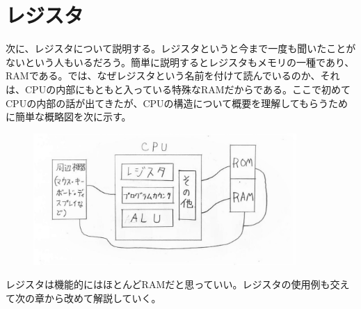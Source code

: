 \section{レジスタ}
次に、レジスタについて説明する。レジスタというと今まで一度も聞いたことがないという人もいるだろう。簡単に説明するとレジスタもメモリの一種であり、RAMである。では、なぜレジスタという名前を付けて読んでいるのか、それは、CPUの内部にもともと入っている特殊なRAMだからである。ここで初めてCPUの内部の話が出てきたが、CPUの構造について概要を理解してもらうために簡単な概略図を次に示す。\\
\begin{figure}[H]
  \centering
  \includegraphics[height=5cm]{honda/image/8.jpeg}
\end{figure}
レジスタは機能的にはほとんどRAMだと思っていい。レジスタの使用例も交えて次の章から改めて解説していく。

